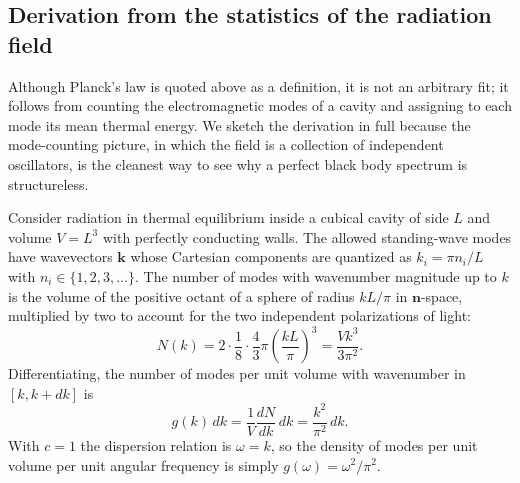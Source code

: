 \documentclass[10pt]{article}
\theoremstyle{definition}
\theoremstyle{remark}
\begin{document}
\subsection{Derivation from the statistics of the radiation field}

Although Planck's law is quoted above as a definition, it is not an arbitrary fit; it follows from counting the electromagnetic modes of a cavity and assigning to each mode its mean thermal energy. We sketch the derivation in full because the mode-counting picture, in which the field is a collection of independent oscillators, is the cleanest way to see why a perfect black body spectrum is structureless.

Consider radiation in thermal equilibrium inside a cubical cavity of side $L$ and volume $V = L^3$ with perfectly conducting walls. The allowed standing-wave modes have wavevectors $\mathbf{k}$ whose Cartesian components are quantized as $k_i = \pi n_i / L$ with $n_i \in \{1,2,3,\dots\}$. The number of modes with wavenumber magnitude up to $k$ is the volume of the positive octant of a sphere of radius $kL/\pi$ in $\mathbf{n}$-space, multiplied by two to account for the two independent polarizations of light:
\begin{equation}
N(k) = 2 \cdot \frac{1}{8}\cdot\frac{4}{3}\pi\!\left(\frac{kL}{\pi}\right)^{\!3} = \frac{V k^3}{3\pi^2}.
\end{equation}
Differentiating, the number of modes per unit volume with wavenumber in $[k, k+dk]$ is
\begin{equation}
g(k)\,dk = \frac{1}{V}\frac{dN}{dk}\,dk = \frac{k^2}{\pi^2}\,dk.
\end{equation}
With $c = 1$ the dispersion relation is $\omega = k$, so the density of modes per unit volume per unit angular frequency is simply $g(\omega) = \omega^2/\pi^2$.
\end{document}
